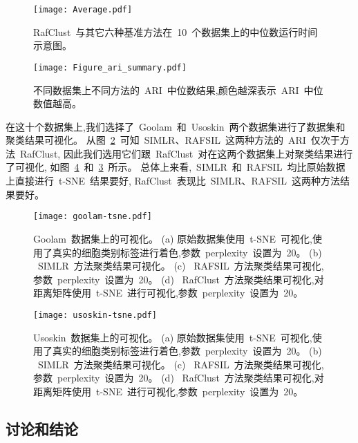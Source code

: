   \begin{figure}[!htbp]
    \centering
    \texttt{[image: Average.pdf]}
    \caption{
    RafClust~与其它六种基准方法在~10~个数据集上的中位数运行时间示意图。
    }
    \label{fig:running-summary}
\end{figure}

\begin{figure}[!htbp]
    \centering
    \texttt{[image: Figure\_ari\_summary.pdf]}
    \caption{
    不同数据集上不同方法的~ARI~中位数结果,颜色越深表示~ARI~中位数值越高。
    }
    \label{fig:rafari}
\end{figure}

在这十个数据集上,我们选择了~Goolam~和~Usoskin~两个数据集进行了数据集和聚类结果可视化。
从图~\ref{fig:rafari}~可知~SIMLR、RAFSIL~这两种方法的~ARI~仅次于方法~RafClust,
因此我们选用它们跟~RafClust~对在这两个数据集上对聚类结果进行了可视化, 
如图~\ref{fig:usoskin-tsne}~和~\ref{fig:goolam-tsne}~所示。
总体上来看,~SIMLR~和~RAFSIL~均比原始数据上直接进行~t-SNE~结果要好,
RafClust~表现比~SIMLR、RAFSIL~这两种方法结果要好。

\begin{figure}[!htbp]
  \centering
  \texttt{[image: goolam-tsne.pdf]}
  \caption{
  Goolam~数据集上的可视化。
  (a) 原始数据集使用~t-SNE~可视化,使用了真实的细胞类别标签进行着色,参数~perplexity~设置为~20。
  (b) ~SIMLR~方法聚类结果可视化。
  (c) ~RAFSIL~方法聚类结果可视化,参数~perplexity~设置为~20。
  (d) ~RafClust~方法聚类结果可视化,对距离矩阵使用~t-SNE~进行可视化,参数~perplexity~设置为~20。
  }
  \label{fig:goolam-tsne}
\end{figure}


\begin{figure}[!htbp]
  \centering
  \texttt{[image: usoskin-tsne.pdf]}
  \caption{
  Usoskin~数据集上的可视化。
  (a) 原始数据集使用~t-SNE~可视化,使用了真实的细胞类别标签进行着色,参数~perplexity~设置为~20。
  (b) ~SIMLR~方法聚类结果可视化。
  (c) ~RAFSIL~方法聚类结果可视化,参数~perplexity~设置为~20。
  (d) ~RafClust~方法聚类结果可视化,对距离矩阵使用~t-SNE~进行可视化,参数~perplexity~设置为~20。
  }
  \label{fig:usoskin-tsne}
\end{figure}

\subsection{讨论和结论}

